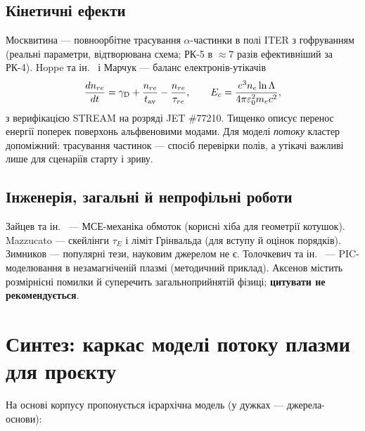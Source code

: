 \documentclass[11pt,a4paper]{article}
\begin{document}
\subsection{Кінетичні ефекти}

Москвитина \cite{Moskvitina2010} --- повноорбітне трасування $\alpha$-частинки в
полі ITER з гофруванням (реальні параметри, відтворювана схема; РК-5 в $\approx7$ разів
ефективніший за РК-4). Hoppe та ін.\ \cite{Hoppe2022} і Марчук \cite{Marchuk2025} ---
баланс електронів-утікачів
\begin{equation}\label{eq:RE}
  \frac{dn_{re}}{dt}=\gamma_{\rm D}+\frac{n_{re}}{t_{\rm av}}-\frac{n_{re}}{\tau_{re}},\qquad
  E_c=\frac{e^3n_e\ln\Lambda}{4\pi\varepsilon_0^2m_ec^2},
\end{equation}
з верифікацією STREAM на розряді JET \#77210. Тищенко \cite{Tyshchenko2021} описує
перенос енергії поперек поверхонь альфвеновими модами. Для моделі \emph{потоку}
кластер допоміжний: трасування частинок --- спосіб перевірки полів, а утікачі
важливі лише для сценаріїв старту і зриву.

\subsection{Інженерія, загальні й непрофільні роботи}

Зайцев та ін.\ \cite{Zaitsev2003,Zaitsev2001} --- МСЕ-механіка обмоток (корисні хіба
для геометрії котушок). Mazzucato \cite{Mazzucato2000} --- скейлінги $\tau_E$ і ліміт
Грінвальда (для вступу й оцінок порядків). Зимников \cite{Zimnikov2016} ---
популярні тези, науковим джерелом не є. Толочкевич та ін.\ \cite{Tolochkevych2015}
--- PIC-моделювання в незамагніченій плазмі (методичний приклад).
Аксенов \cite{Aksenov2015} містить розмірнісні помилки й суперечить
загальноприйнятій фізиці; \textbf{цитувати не рекомендується}.

\section{Синтез: каркас моделі потоку плазми для проєкту}

На основі корпусу пропонується ієрархічна модель (у дужках --- джерела-основи):
\end{document}
